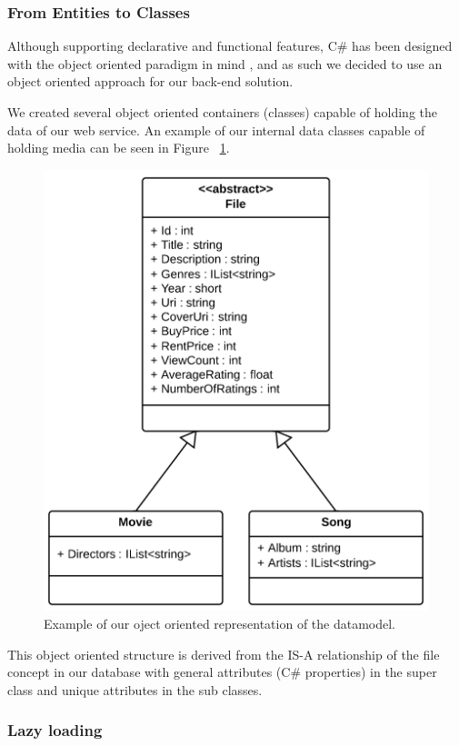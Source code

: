 \subsubsection{From Entities to Classes}
Although supporting declarative and functional features, C\# has been designed with the object oriented paradigm in mind \cite{csharpecma}, and as such we decided to use an object oriented approach for our back-end solution. 

We created several object oriented containers (classes) capable of holding the data of our web service. An example of our internal data classes capable of holding media can be seen in Figure ~\ref{fig:orm}.
\begin{figure}[hbt]
	\centering
	\includegraphics[scale=0.7]{./p1design/orm.png}
	\caption{Example of our oject oriented representation of the datamodel.}
	\label{fig:orm}
\end{figure}

This object oriented structure is derived from the IS-A relationship of the file concept in our database with general attributes (C\# properties) in the super class and unique attributes in the sub classes.

\subsubsection{Lazy loading}

